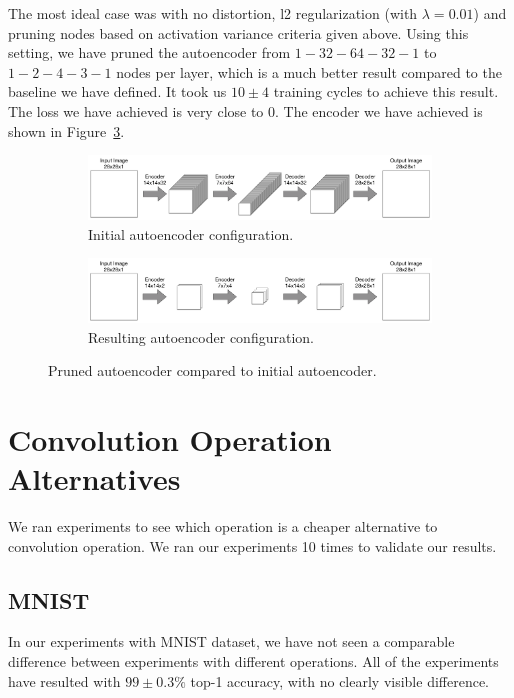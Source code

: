 The most ideal case was with no distortion, l2 regularization (with $\lambda = 0.01$) and pruning nodes based on activation variance criteria given above. Using this setting, we have pruned the autoencoder from $1-32-64-32-1$ to $1-2-4-3-1$ nodes per layer, which is a much better result compared to the baseline we have defined. It took us $10\pm4$ training cycles to achieve this result. The loss we have achieved is very close to 0. The encoder we have achieved is shown in Figure~\ref{fig:pruned_autoencoder}.
\begin{figure}[!h]
    \begin{subfigure}{1\textwidth}
        \hspace{-.1\linewidth}
        \includegraphics[width=1.2\linewidth]{images/over_parameterized_autoencoder.pdf}
        \caption{Initial autoencoder configuration.}
        \label{fig:initial_autoencoder}
    \end{subfigure}
    \begin{subfigure}{1\textwidth}
        \hspace{-.1\linewidth}
        \includegraphics[width=1.2\linewidth]{images/optimum_autoencoder.pdf}
        \caption{Resulting autoencoder configuration.}
        \label{fig:pruned_autoencoder}
    \end{subfigure}
    \caption{Pruned autoencoder compared to initial autoencoder.}
    \label{fig:pruned_autoencoder}
\end{figure}

\newpage
\section{Convolution Operation Alternatives}
We ran experiments to see which operation is a cheaper alternative to convolution operation. We ran our experiments 10 times to validate our results.
\subsection{MNIST}
In our experiments with MNIST dataset, we have not seen a comparable difference between experiments with different operations. All of the experiments have resulted with $99\pm0.3\%$ top-1 accuracy, with no clearly visible difference.

